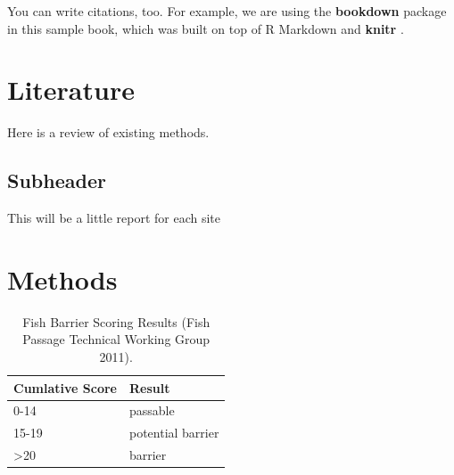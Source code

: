 \documentclass[
]{book}
\begin{document}
You can write citations, too. For example, we are using the \textbf{bookdown} package \citep{R-bookdown} in this sample book, which was built on top of R Markdown and \textbf{knitr} \citep{xie2015}.

\hypertarget{literature}{%
\chapter{Literature}\label{literature}}

Here is a review of existing methods.

\hypertarget{subheader}{%
\section{Subheader}\label{subheader}}

This will be a little report for each site

\hypertarget{methods}{%
\chapter{Methods}\label{methods}}

\begin{table}

\caption{\label{tab:unnamed-chunk-6}Fish Barrier Scoring (Fish Passage Technical Working Group 2011).}
\centering
{}
\end{table}

\begin{table}

\caption{\label{tab:unnamed-chunk-7}Fish Barrier Scoring Results (Fish Passage Technical Working Group 2011).}
\centering
\begin{tabular}[t]{l|l}
\hline
Cumlative Score & Result\\
\hline
0-14 & passable\\
\hline
15-19 & potential barrier\\
\hline
>20 & barrier\\
\hline
\end{tabular}
\end{table}
\end{document}
